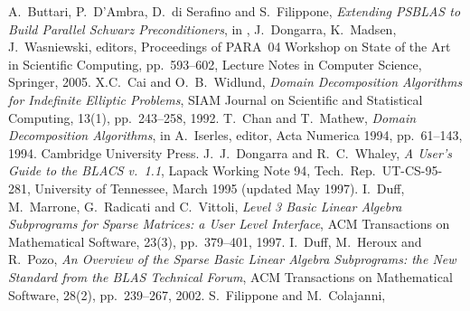 \begin{thebibliography}{99}
%
%
A.~Buttari, P.~D'Ambra, D.~di Serafino and S.~Filippone,
{\em Extending PSBLAS to Build Parallel Schwarz Preconditioners},
in , J.~Dongarra, K.~Madsen, J.~Wasniewski, editors,
Proceedings of PARA~04 Workshop on State of the Art
in Scientific Computing, pp.~593--602, Lecture Notes in Computer Science,
Springer, 2005.
%
%
X.C.~Cai and O.~B.~Widlund,
{\em Domain Decomposition Algorithms for Indefinite Elliptic Problems},
SIAM Journal on Scientific and Statistical Computing, 13(1), pp.~243--258, 1992.
%
T.~Chan and T.~Mathew,
{\em Domain Decomposition Algorithms},
in A.~Iserles, editor, Acta Numerica 1994, pp.~61--143, 1994.
Cambridge University Press.
%
J.~J.~Dongarra and R.~C.~Whaley,
{\em A User's Guide to the BLACS v.~1.1},
Lapack Working Note 94, Tech.\ Rep.\ UT-CS-95-281, University of
Tennessee, March 1995 (updated May 1997).
%
I.~Duff, M.~Marrone, G.~Radicati and C.~Vittoli,
{\em Level 3 Basic Linear Algebra Subprograms for Sparse Matrices: 
a User Level Interface},
ACM Transactions on Mathematical Software, 23(3), pp.~379--401, 1997.
%
I.~Duff, M.~Heroux and R.~Pozo,
{\em An Overview of the Sparse Basic Linear
Algebra Subprograms: the New Standard from the BLAS Technical Forum},
ACM Transactions on Mathematical Software, 28(2), pp.~239--267, 2002.
%
S.~Filippone and M.~Colajanni, 

\end{thebibliography}
